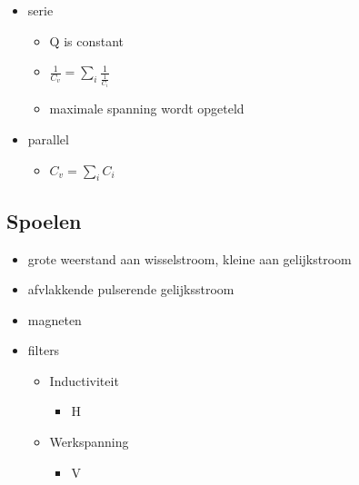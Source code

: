 \documentclass[11pt]{article}
\let\originalitem\item
\renewcommand{\item}{\originalitem[]}
\newcommand{\Newpage}{\end{preview}\begin{preview}}
\begin{document}
\begin{preview}
\begin{itemize}
\begin{itemize}
	\end{itemize}
	\item serie
	\begin{itemize}
		\item Q is constant
		\item $\frac{1}{C_v} = \sum_i \frac{1}{\frac{1}{C_i}} $
		\item maximale spanning wordt opgeteld
	\end{itemize}
	\item parallel
	\begin{itemize}
		\item $C_v = \sum_i C_i $
	\end{itemize}
\end{itemize}

\Newpage
\section{Spoelen}

\begin{itemize}
	\item grote weerstand aan wisselstroom, kleine aan gelijkstroom
	\item afvlakkende pulserende gelijksstroom
	\item magneten
	\item filters
	\begin{itemize}
		\item Inductiviteit
		\begin{itemize}
			\item H
		\end{itemize}
		\item Werkspanning
		\begin{itemize}
			\item V
		\end{itemize}
	\end{itemize}
\end{itemize}

\end{preview}
\end{document}
